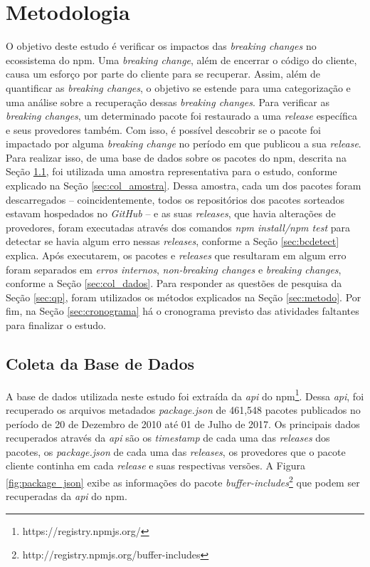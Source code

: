 \chapter{Metodologia}
\label{cap:metodologia}

O objetivo deste estudo é verificar os impactos das \textit{breaking changes} no ecossistema do \gls{npm}. Uma \textit{breaking change}, além de encerrar o código do cliente, causa um esforço por parte do cliente para se recuperar. Assim, além de quantificar as \textit{breaking changes}, o objetivo se estende para uma categorização e uma análise sobre a recuperação dessas \textit{breaking changes}. Para verificar as \textit{breaking changes}, um determinado pacote foi restaurado a uma \textit{release} específica e seus provedores também. Com isso, é possível descobrir se o pacote foi impactado por alguma \textit{breaking change} no período em que publicou a sua \textit{release}. Para realizar isso, de uma base de dados sobre os pacotes do \gls{npm}, descrita na Seção \ref{sec:col_base}, foi utilizada uma amostra representativa para o estudo, conforme explicado na Seção \ref{sec:col_amostra}. Dessa amostra, cada um dos pacotes foram descarregados -- coincidentemente, todos os repositórios dos pacotes sorteados estavam hospedados no \textit{GitHub} -- e as suas \textit{releases}, que havia alterações de provedores, foram executadas através dos comandos \textit{npm install/npm test} para detectar se havia algum erro nessas \textit{releases}, conforme a Seção \ref{sec:bcdetect} explica. Após executarem, os pacotes e \textit{releases} que resultaram em algum erro foram separados em \textit{erros internos}, \textit{non-breaking changes} e \textit{breaking changes}, conforme a Seção \ref{sec:col_dados}. Para responder as questões de pesquisa da Seção \ref{sec:qp}, foram utilizados os métodos explicados na Seção \ref{sec:metodo}. Por fim, na Seção \ref{sec:cronograma} há o cronograma previsto das atividades faltantes para finalizar o estudo.

\section{Coleta da Base de Dados}
\label{sec:col_base}
A base de dados utilizada neste estudo foi extraída da \textit{api} do \gls{npm}\footnote{https://registry.npmjs.org/}. Dessa \textit{api}, foi recuperado os arquivos metadados \textit{package.json} de 461,548 pacotes publicados no período de 20 de Dezembro de 2010 até 01 de Julho de 2017. Os principais dados recuperados através da \textit{api} são os \textit{timestamp} de cada uma das \textit{releases} dos pacotes, os \textit{package.json} de cada uma das \textit{releases}, os provedores que o pacote cliente continha em cada \textit{release} e suas respectivas versões. A Figura \ref{fig:package_json} exibe as informações do pacote \textit{buffer-includes}\footnote{http://registry.npmjs.org/buffer-includes} que podem ser recuperadas da \textit{api} do \gls{npm}.

